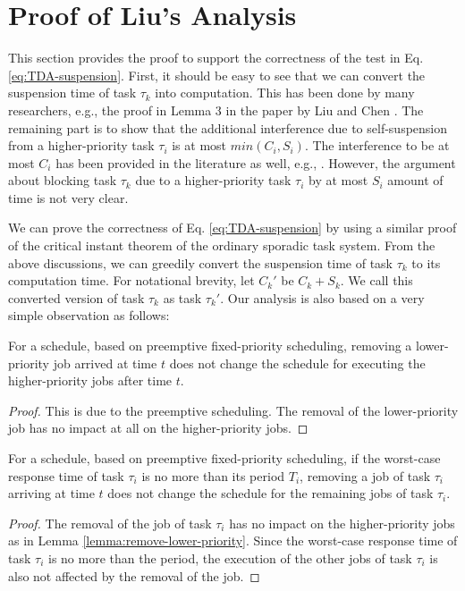 
\section{Proof of Liu's Analysis}  

This section provides the proof to support the correctness of the test in Eq. \eqref{eq:TDA-suspension}. First, it should be easy to see that we can convert the suspension time of task $\tau_k$ into computation. This has been done by many researchers, e.g., the proof in Lemma 3 in the paper by Liu and Chen \cite{Liu_2014}. The remaining part is to show that the additional interference due to self-suspension from a higher-priority task $\tau_i$ is at most $min(C_i, S_i)$. The interference to be at most $C_i$ has been provided in the literature as well, e.g., \cite{Rajkumar_1990}\cite{Liu_2014}. However, the argument about blocking task $\tau_k$ due to a higher-priority task $\tau_i$ by at most $S_i$ amount of time is not very clear. 

We can prove the correctness of Eq. \eqref{eq:TDA-suspension} by using a similar proof of the critical instant theorem of the ordinary sporadic task system. From the above discussions, we can greedily convert the suspension time of task $\tau_k$ to its computation time. For notational brevity, let $C_k'$ be $C_k + S_k$. We call this converted version of task $\tau_k$ as task $\tau_k'$. Our analysis is also based on a very simple observation as follows:
\begin{lemma}
\label{lemma:remove-lower-priority}
  For a schedule, based on preemptive fixed-priority scheduling, removing a lower-priority job arrived at time $t$ does not change the schedule for executing the higher-priority jobs after time $t$.
\end{lemma}
\begin{proof}
  This is due to the preemptive scheduling. The removal of the lower-priority job has no impact at all on the higher-priority jobs.
\end{proof}
\begin{lemma}
\label{lemma:remove-same-task}
  For a schedule, based on preemptive fixed-priority scheduling, if the worst-case response time of task $\tau_i$ is no more than its period $T_i$, removing a job of task $\tau_i$ arriving at time $t$ does not change the schedule for the remaining jobs of task $\tau_i$.
\end{lemma}
\begin{proof}
  The removal of the job of task $\tau_i$ has no impact on the higher-priority jobs as in Lemma \ref{lemma:remove-lower-priority}. Since the worst-case response time of task $\tau_i$ is no more than the period, the execution of the other jobs of task $\tau_i$ is also not affected by the removal of the job.
\end{proof}

